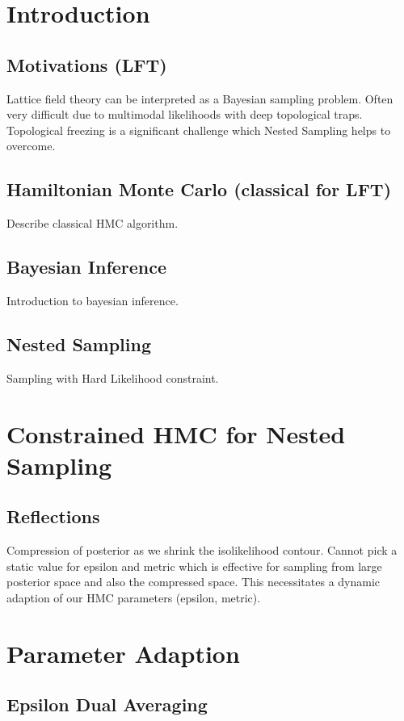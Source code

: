 \documentclass[11pt]{article}
\begin{document}
    \section{Introduction}
    \subsection{Motivations (LFT)}
    Lattice field theory can be interpreted as a Bayesian sampling problem.
    Often very difficult due to multimodal likelihoods with deep topological traps.
    Topological freezing is a significant challenge which Nested Sampling helps to overcome.

    \subsection{Hamiltonian Monte Carlo (classical for LFT)}
    Describe classical HMC algorithm. \autocite{betancourt2018conceptual}

    \subsection{Bayesian Inference}
    Introduction to bayesian inference.

    \subsection{Nested Sampling}
    Sampling with Hard Likelihood constraint.

    \section{Constrained HMC for Nested Sampling}
    \subsection{Reflections}
    Compression of posterior as we shrink the isolikelihood contour.
    Cannot pick a static value for epsilon and metric which is effective for sampling
    from large posterior space and also the compressed space.
    This necessitates a dynamic adaption of our HMC parameters (epsilon, metric).

    \section{Parameter Adaption}
    \subsection{Epsilon Dual Averaging}
\end{document}
